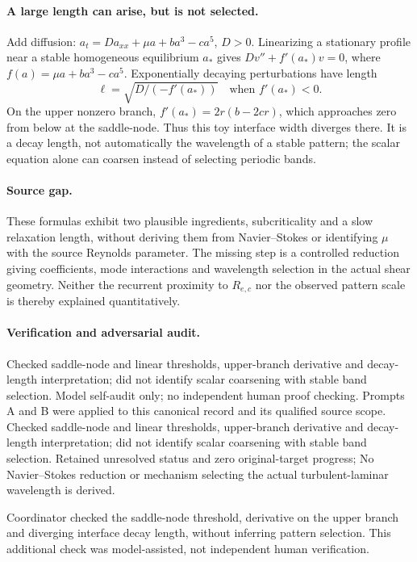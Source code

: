 \documentclass[11pt]{article}
\begin{document}
\paragraph{A large length can arise, but is not selected.} Add diffusion: $a_t=D a_{xx}+\mu a+ba^3-ca^5$, $D>0$. Linearizing a stationary profile near a stable homogeneous equilibrium $a_*$ gives $D v''+f'(a_*)v=0$, where $f(a)=\mu a+ba^3-ca^5$. Exponentially decaying perturbations have length
\[
 \ell=\sqrt{D/(-f'(a_*))}\quad\text{when }f'(a_*)<0.
\]
On the upper nonzero branch, $f'(a_*)=2r(b-2cr)$, which approaches zero from below at the saddle-node. Thus this toy interface width diverges there. It is a decay length, not automatically the wavelength of a stable pattern; the scalar equation alone can coarsen instead of selecting periodic bands.

\paragraph{Source gap.} These formulas exhibit two plausible ingredients, subcriticality and a slow relaxation length, without deriving them from Navier--Stokes or identifying $\mu$ with the source Reynolds parameter. The missing step is a controlled reduction giving coefficients, mode interactions and wavelength selection in the actual shear geometry. Neither the recurrent proximity to $R_{e,c}$ nor the observed pattern scale is thereby explained quantitatively.

\paragraph{Verification and adversarial audit.}
Checked saddle-node and linear thresholds, upper-branch derivative and decay-length interpretation; did not identify scalar coarsening with stable band selection. Model self-audit only; no independent human proof checking. Prompts A and B were applied to this canonical record and its qualified source scope. Checked saddle-node and linear thresholds, upper-branch derivative and decay-length interpretation; did not identify scalar coarsening with stable band selection. Retained unresolved status and zero original-target progress; No Navier–Stokes reduction or mechanism selecting the actual turbulent-laminar wavelength is derived.

Coordinator checked the saddle-node threshold, derivative on the upper branch and diverging interface decay length, without inferring pattern selection. This additional check was model-assisted, not independent human verification.
\end{document}
